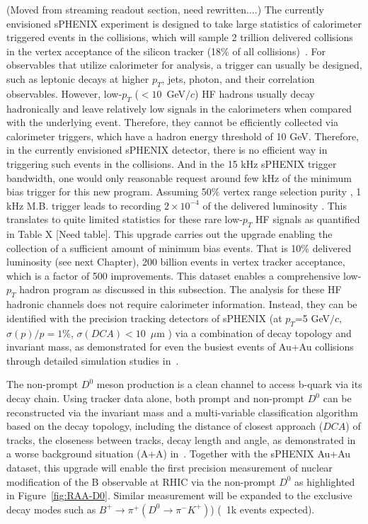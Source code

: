 (Moved from streaming readout section, need rewritten....)
The currently envisioned sPHENIX experiment is designed to take large statistics of calorimeter triggered events in the \pp collisions, which will sample 2 trillion delivered \pp collisions in the vertex acceptance of the silicon tracker (18\% of all collisions)~\cite{something}. For observables that utilize calorimeter for analysis, a trigger can usually be designed, such as leptonic decays at higher $p_T$, jets, photon, and their correlation observables. However, low-$p_T$  ($<10$~GeV$/c$) HF hadrons usually decay hadronically and leave relatively low signals in the calorimeters when compared with the underlying event. Therefore, they cannot be efficiently collected via calorimeter triggers, which have a hadron energy threshold of 10 GeV. Therefore, in the currently envisioned sPHENIX detector, there is no efficient way in triggering such events in the \pp collisions. And in the 15 kHz sPHENIX trigger bandwidth, one would only reasonable request around few kHz of the minimum bias \pp trigger for this new program. Assuming 50\% vertex range selection purity , 1 kHz M.B. trigger leads to recording $2\times10^{-4}$ of the delivered luminosity . This translates to quite limited statistics for these rare low-$p_T$ HF signals as quantified in Table X [Need table].
This upgrade carries out the upgrade enabling the collection of a sufficient amount of minimum bias \pp events. That is 10\% delivered luminosity (see next Chapter), 200 billion events in vertex tracker acceptance, which is a factor of 500 improvements. This dataset enables a comprehensive low-$p_T$ hadron program as discussed in this subsection. The analysis for these HF hadronic channels does not require calorimeter information. Instead, they can be identified with the precision tracking detectors of sPHENIX (at $p_T$=5 GeV$/c$, $\sigma(p)/p=1\%$, $\sigma(DCA)<10$~$\mu$m ) via a combination of decay topology and invariant mass, as demonstrated for even the busiest events of Au+Au collisions through detailed simulation studies in~\cite{something}. 
 
The non-prompt $D^0$ meson production is a clean channel to access b-quark via its decay chain. Using tracker data alone, both prompt and non-prompt $D^0$ can be reconstructed via the invariant mass and a multi-variable classification algorithm based on the decay topology, including the distance of closest approach ($DCA$) of tracks, the closeness between tracks, decay length and angle, as demonstrated in a worse background situation (A+A) in~\cite{something}. Together with the sPHENIX Au+Au dataset, this upgrade will enable the first precision measurement of nuclear modification of the B observable at RHIC via the non-prompt $D^0$ as highlighted in Figure~\ref{fig:RAA-D0}. Similar measurement will be expanded to the exclusive decay modes such as $B^+ \rightarrow \pi^+ (D^0 \rightarrow \pi^- K^+)$) (~1k events expected).

